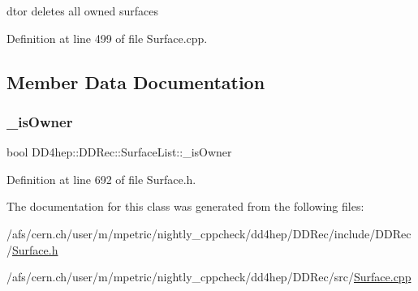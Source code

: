 d\textquotesingle{}tor deletes all owned surfaces 



Definition at line 499 of file Surface.\+cpp.



\subsection{Member Data Documentation}
\hypertarget{class_d_d4hep_1_1_d_d_rec_1_1_surface_list_a6eb49bbfb8b3b4f548dd9d52f0e0e507}{}\label{class_d_d4hep_1_1_d_d_rec_1_1_surface_list_a6eb49bbfb8b3b4f548dd9d52f0e0e507} 
\subsubsection{\texorpdfstring{\+\_\+is\+Owner}{\_isOwner}}
{\footnotesize\ttfamily bool D\+D4hep\+::\+D\+D\+Rec\+::\+Surface\+List\+::\+\_\+is\+Owner\hspace{0.3cm}{\ttfamily [protected]}}



Definition at line 692 of file Surface.\+h.



The documentation for this class was generated from the following files\+:\begin{DoxyCompactItemize}
\item 
/afs/cern.\+ch/user/m/mpetric/nightly\+\_\+cppcheck/dd4hep/\+D\+D\+Rec/include/\+D\+D\+Rec/\hyperlink{_surface_8h}{Surface.\+h}\item 
/afs/cern.\+ch/user/m/mpetric/nightly\+\_\+cppcheck/dd4hep/\+D\+D\+Rec/src/\hyperlink{_surface_8cpp}{Surface.\+cpp}\end{DoxyCompactItemize}
